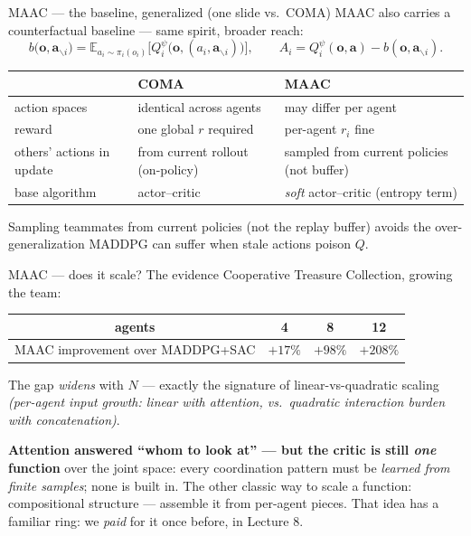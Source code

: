 \documentclass[10pt, aspectratio=169]{beamer}
\newcommand{\paper}[1]{\textcolor{mLightBrown}{\small\textit{(#1)}}}
\begin{document}
\begin{frame}{MAAC --- the baseline, generalized (one slide vs.\ COMA)}
MAAC also carries a counterfactual baseline --- same spirit, broader reach:
\[
b\big(\mathbf{o}, \mathbf{a}_{\backslash i}\big) = \mathbb{E}_{a_i\sim\pi_i(o_i)}\Big[ Q_i^{\psi}\big(\mathbf{o}, (a_i, \mathbf{a}_{\backslash i})\big) \Big],
\qquad
A_i = Q_i^{\psi}(\mathbf{o},\mathbf{a}) - b(\mathbf{o},\mathbf{a}_{\backslash i}).
\]
\smallskip
\begin{center}\footnotesize\renewcommand{\arraystretch}{1.45}
\begin{tabular}{l|l|l}
 & \textbf{COMA} & \textbf{MAAC} \\
\hline
action spaces & identical across agents & may differ per agent \\
reward & one global $r$ required & per-agent $r_i$ fine \\
others' actions in update & from current rollout (on-policy) & sampled from \alert{current policies} (not buffer) \\
base algorithm & actor--critic & \emph{soft} actor--critic (entropy term) \\
\end{tabular}
\end{center}
\smallskip
\pause
{\footnotesize Sampling teammates from current policies (not the replay buffer) avoids the over-generalization MADDPG can suffer when stale actions poison $Q$.}
\end{frame}

\begin{frame}{MAAC --- does it scale? The evidence}
Cooperative Treasure Collection, growing the team:
\begin{center}\footnotesize\renewcommand{\arraystretch}{1.4}
\begin{tabular}{c|c|c|c}
agents & 4 & 8 & 12 \\
\hline
MAAC improvement over MADDPG+SAC & $+17\%$ & $+98\%$ & \alert{$+208\%$} \\
\end{tabular}
\end{center}
\medskip
The gap \emph{widens} with $N$ --- exactly the signature of linear-vs-quadratic scaling \paper{per-agent input growth: linear with attention, vs.\ quadratic interaction burden with concatenation}.
\medskip

\pause
\textbf{Attention answered ``whom to look at'' --- but the critic is still \emph{one} function} over the joint space: every coordination pattern must be \emph{learned from finite samples}; \alert{none is built in}.
\smallskip
\pause
The other classic way to scale a function: \alert{compositional structure} --- assemble it from per-agent pieces. That idea has a familiar ring: we \emph{paid} for it once before, in Lecture 8.
\end{frame}
\end{document}
